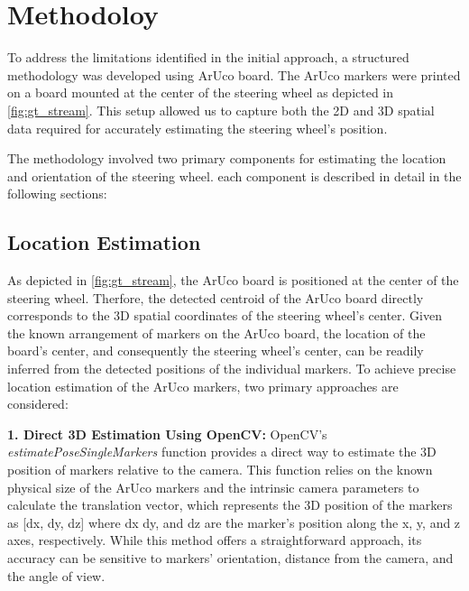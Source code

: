\section{Methodoloy}
To address the limitations identified in the initial approach, 
a structured methodology was developed using ArUco board. The ArUco markers were printed on a board mounted 
at the center of the steering wheel as depicted in 
\cref{fig:gt_stream}. This setup allowed us to capture both the 
2D and 3D spatial data required for accurately estimating the 
steering wheel's position.

The methodology involved two primary components for estimating 
the location and orientation of the steering wheel. 
each component is described in detail in the following 
sections:

\subsection{Location Estimation}
As depicted in \cref{fig:gt_stream}, the ArUco board is positioned at the center of the steering 
wheel. Therfore, the detected centroid of the ArUco board directly 
corresponds to the 3D spatial coordinates of the steering 
wheel's center. Given the known arrangement of markers on the 
ArUco board, the location of the board's center, and 
consequently the steering wheel's center, can be readily 
inferred from the detected positions of the individual markers.
To achieve precise location estimation of the ArUco markers, two primary approaches are considered:

\textbf{1. Direct 3D Estimation Using OpenCV: }
OpenCV’s \emph{estimatePoseSingleMarkers} function provides a direct 
way to estimate the 3D position of markers relative to the camera. 
This function relies on the known physical size of the 
ArUco markers and the intrinsic camera parameters to calculate 
the translation vector, which represents the 3D position of 
the markers as [dx, dy, dz] where dx dy, and dz are the marker's 
position along the x, y, and z axes, respectively. 
While this method offers a straightforward approach, its 
accuracy can be sensitive to markers' orientation, distance from 
the camera, and the angle of view.


